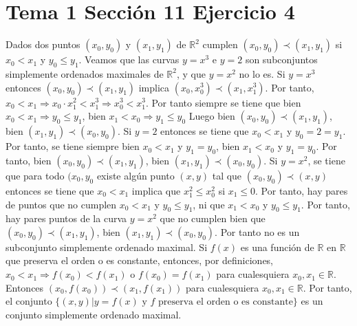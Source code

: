 \documentclass{article}
\begin{document}
\section{Tema 1 Sección 11 Ejercicio 4}
Dados dos puntos $(x_0,y_0)$ y $(x_1,y_1)$ de $\mathbb{R}^2$ cumplen $(x_0,y_0)\prec (x_1,y_1)$ si $x_0<x_1$ y $y_0\leq y_1$. Veamos que las curvas $y=x^3$ e $y=2$ son subconjuntos simplemente ordenados maximales de $\mathbb{R}^2$, y que $y=x^2$ no lo es. Si $y=x^3$ entonces $(x_0,y_0)\prec (x_1,y_1)$ implica $(x_0,x^3_0)\prec (x_1,x^3_1)$. Por tanto, $x_0<x_1\Rightarrow x_0\cdot x_1^2<x_1^3\Rightarrow x_0^3<x_1^3$. Por tanto siempre se tiene que bien $x_0<x_1\Rightarrow y_0\leq y_1$, bien $x_1<x_0 \Rightarrow  y_1\leq y_0$ Luego bien $(x_0,y_0)\prec (x_1,y_1)$, bien $(x_1,y_1)\prec (x_0,y_0)$. Si $y=2$ entonces se tiene que $x_0<x_1$ y $y_0=2=y_1$. Por tanto, se tiene siempre bien $x_0<x_1$ y $y_1=y_0$, bien $x_1<x_0$ y $y_1=y_0$. Por tanto, 
bien $(x_0,y_0)\prec (x_1,y_1)$, bien $(x_1,y_1)\prec (x_0,y_0)$. Si $y=x^2$, se tiene que para todo $(x_0,y_0$ existe algún punto $(x,y)$ tal que $(x_0,y_0)\prec (x,y)$  entonces se tiene que $x_0<x_1$ implica que $x_1^2\leq x_0^2$ si $x_1\leq 0$. Por tanto, hay pares de puntos que no cumplen $x_0<x_1$ y $y_0\leq y_1$, ni que $x_1<x_0$ y $y_0\leq y_1$. Por tanto, hay pares puntos de la curva $y=x^2$ que no cumplen bien que $(x_0,y_0)\prec (x_1,y_1)$, bien $(x_1,y_1)\prec (x_0,y_0)$. Por tanto no es un subconjunto simplemente ordenado maximal. Si $f(x)$ es una función de $\mathbb{R}$ en $\mathbb{R}$ que preserva el orden o es constante, entonces, por definiciones, $x_0< x_1\Rightarrow f(x_0)<f(x_1)$ o $f(x_0)=f(x_1)$ para cualesquiera $x_0,x_1\in \mathbb{R}$. Entonces 
$(x_0,f(x_0))\prec (x_1,f(x_1))$ para cualesquiera $x_0,x_1\in \mathbb{R}$. Por tanto, el conjunto $\{(x,y)|y=f(x) \text{ y } f \text{ preserva el orden o es constante}\}$ es un conjunto simplemente ordenado maximal.
\end{document}
